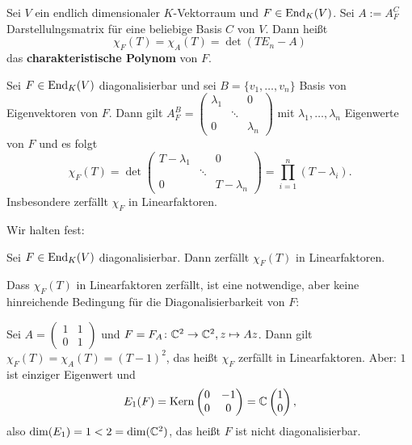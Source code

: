 \begin{definition}
	\label{def:2.3}
	Sei $V$ ein endlich dimensionaler $K$-Vektorraum und $F \in \operatorname{End}_K(V)$.
	Sei $A:= A_F^C$ Darstellulngsmatrix für eine beliebige Basis $C$ von $V$.
	Dann heißt
	\[
		\chi_F(T) = \chi_A(T) = \det(TE_n-A)
	\]
	das \textbf{charakteristische Polynom} von $F$. 
\end{definition}

\begin{beispiel}
	\label{bsp:2.4}
	Sei $F \in \operatorname{End}_K(V)$ diagonalisierbar und sei $B = \{v_1,\dots,v_n\}$ Basis von Eigenvektoren von $F$.
	Dann gilt $A_F^B = \begin{pmatrix}
	\lambda_1 &  & 0 \\ 
	& \ddots &  \\ 
	0 &  & \lambda_n
	\end{pmatrix}$ mit $\lambda_1,\dots,\lambda_n$ Eigenwerte von $F$ und es folgt
	\[
		\chi_F(T) = \det\begin{pmatrix}
			T-\lambda_1 &  & 0 \\ 
			& \ddots &  \\ 
			0 &  & T-\lambda_n
			\end{pmatrix} = \prod_{i=1}^{n} (T-\lambda_i).
	\]
	Insbesondere zerfällt $\chi_F$ in Linearfaktoren.
\end{beispiel}

Wir halten fest:
\begin{satz}
	\label{satz:2.5}
	Sei $F \in \operatorname{End}_K(V)$ diagonalisierbar.
	Dann zerfällt $\chi_F(T)$ in Linearfaktoren.
\end{satz}

\begin{beispiel}
	\label{bsp:2.6}
	Dass $\chi_F(T)$ in Linearfaktoren zerfällt, ist eine notwendige, aber keine hinreichende Bedingung für die Diagonalisierbarkeit von $F$:
	
	Sei $A = \begin{pmatrix}
	1 & 1 \\ 
	0 & 1
	\end{pmatrix}$ und $F = F_A\colon \mathbb{C}^2 \rightarrow \mathbb{C}^2, z \mapsto Az$.
	Dann gilt $\chi_F(T) = \chi_A(T) = (T-1)^2$, das heißt $\chi_F$ zerfällt in Linearfaktoren. Aber: $1$ ist einziger Eigenwert und
	\[
		E_1(F) = \operatorname{Kern}\begin{pmatrix}
		0 & -1 \\ 
		0 & 0
		\end{pmatrix} = \mathbb{C} \begin{pmatrix}
		1 \\ 
		0 
		\end{pmatrix},
	\]
	also $\dim(E_1) = 1 < 2 = \dim(\mathbb{C}^2)$, das heißt $F$ ist nicht diagonalisierbar.
\end{beispiel}

